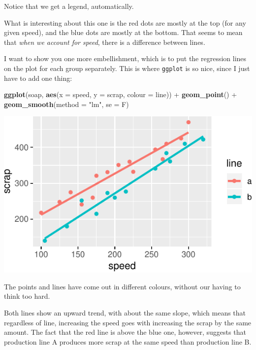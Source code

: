 \documentclass[]{tufte-book}
\newenvironment{Shaded}{}{}
\newcommand{\DataTypeTok}[1]{\textcolor[rgb]{0.56,0.13,0.00}{#1}}
\newcommand{\KeywordTok}[1]{\textcolor[rgb]{0.00,0.44,0.13}{\textbf{#1}}}
\newcommand{\NormalTok}[1]{#1}
\newcommand{\OperatorTok}[1]{\textcolor[rgb]{0.40,0.40,0.40}{#1}}
\newcommand{\StringTok}[1]{\textcolor[rgb]{0.25,0.44,0.63}{#1}}
\theoremstyle{definition}
\theoremstyle{definition}
\theoremstyle{definition}
\theoremstyle{remark}
\begin{document}
Notice that we get a legend, automatically.

What is interesting about this one is the red dots are mostly at the top
(for any given speed), and the blue dots are mostly at the bottom. That
seems to mean that \emph{when we account for speed}, there is a
difference between lines.

I want to show you one more embellishment, which is to put the
regression lines on the plot for each group separately. This is where
\texttt{ggplot} is so nice, since I just have to add one thing:

\begin{Shaded}
\begin{Highlighting}[]
\KeywordTok{ggplot}\NormalTok{(soap, }\KeywordTok{aes}\NormalTok{(}\DataTypeTok{x =}\NormalTok{ speed, }\DataTypeTok{y =}\NormalTok{ scrap, }\DataTypeTok{colour =}\NormalTok{ line)) }\OperatorTok{+}\StringTok{ }
\StringTok{    }\KeywordTok{geom_point}\NormalTok{() }\OperatorTok{+}\StringTok{ }\KeywordTok{geom_smooth}\NormalTok{(}\DataTypeTok{method =} \StringTok{"lm"}\NormalTok{, }
    \DataTypeTok{se =}\NormalTok{ F)}
\end{Highlighting}
\end{Shaded}

\includegraphics{02-reading-in_files/figure-latex/unnamed-chunk-18-1}

The points and lines have come out in different colours, without our
having to think too hard.

Both lines show an upward trend, with about the same slope, which means
that regardless of line, increasing the speed goes with increasing the
scrap by the same amount. The fact that the red line is above the blue
one, however, suggests that production line A produces more scrap at the
same speed than production line B.
\end{document}
